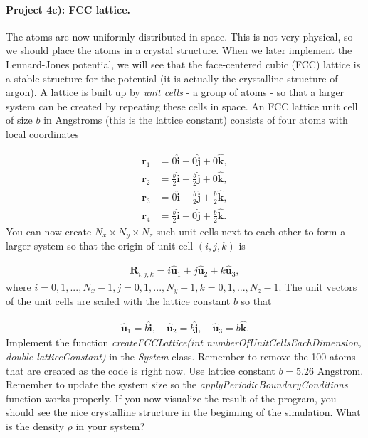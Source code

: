 \documentclass[%
oneside,                 %
final,                   %
10pt]{article}
\begin{document}
\paragraph{Project 4c): FCC lattice.}
The atoms are now uniformly distributed in space. This is not very physical, so we should place the atoms in a crystal structure. When we later implement the Lennard-Jones potential, we will see that the face-centered cubic (FCC) lattice is a stable structure for the potential (it is actually the crystalline structure of argon). A lattice is built up by \emph{unit cells} - a group of atoms - so that a larger system can be created by repeating these cells in space. An FCC lattice unit cell of size $b$ in Angstroms (this is the lattice constant) consists of four atoms with local coordinates

\begin{align}
	\mathbf{r}_1 &= 0 \hat{\mathbf{i}} + 0 \hat{\mathbf{j}} + 0 \hat{\mathbf{k}},\\
	\mathbf{r}_2 &= \frac{b}{2} \hat{\mathbf{i}} + \frac{b}{2} \hat{\mathbf{j}} + 0 \hat{\mathbf{k}},\\
	\mathbf{r}_3 &= 0 \hat{\mathbf{i}} + \frac{b}{2} \hat{\mathbf{j}} + \frac{b}{2} \hat{\mathbf{k}},\\
	\mathbf{r}_4 &= \frac{b}{2} \hat{\mathbf{i}} + 0 \hat{\mathbf{j}} + \frac{b}{2} \hat{\mathbf{k}}.
\end{align}
You can now create $N_x \times N_y \times N_z$ such unit cells next to each other to form a larger system so that the origin of unit cell $(i,j,k)$ is

\begin{align}
	\mathbf{R}_{i,j,k} = i \hat{\mathbf{u}}_1 + j \hat{\mathbf{u}}_2 + k \hat{\mathbf{u}}_3,
\end{align}
where $i=0,1,..., N_x-1, j=0,1,..., N_y-1, k=0,1,..., N_z-1$. The unit vectors of the unit cells are scaled with the lattice constant $b$ so that

\begin{align}
	\hat{\mathbf{u}}_1 = b\hat{\mathbf{i}}, \quad \hat{\mathbf{u}}_2 = b\hat{\mathbf{j}}, \quad \hat{\mathbf{u}}_3 = b\hat{\mathbf{k}}.
\end{align}
Implement the function \emph{createFCCLattice(int numberOfUnitCellsEachDimension, double latticeConstant)} in the \emph{System} class. Remember to remove the 100 atoms that are created as the code is right now. Use lattice constant $b=5.26$ $\mathrm{Angstrom}$. Remember to update the system size so the \emph{applyPeriodicBoundaryConditions} function works properly. If you now visualize the result of the program, you should see the nice crystalline structure in the beginning of the simulation. What is the density $\rho$ in your system?
\end{document}
